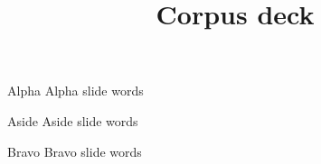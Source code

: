 \documentclass{beamer}
\title{Corpus deck}
\begin{document}
\begin{frame}{Alpha}
  Alpha slide words
\end{frame}
\begin{frame}[noframenumbering]{Aside}
  Aside slide words
\end{frame}
\begin{frame}{Bravo}
  Bravo slide words
\end{frame}
\end{document}
